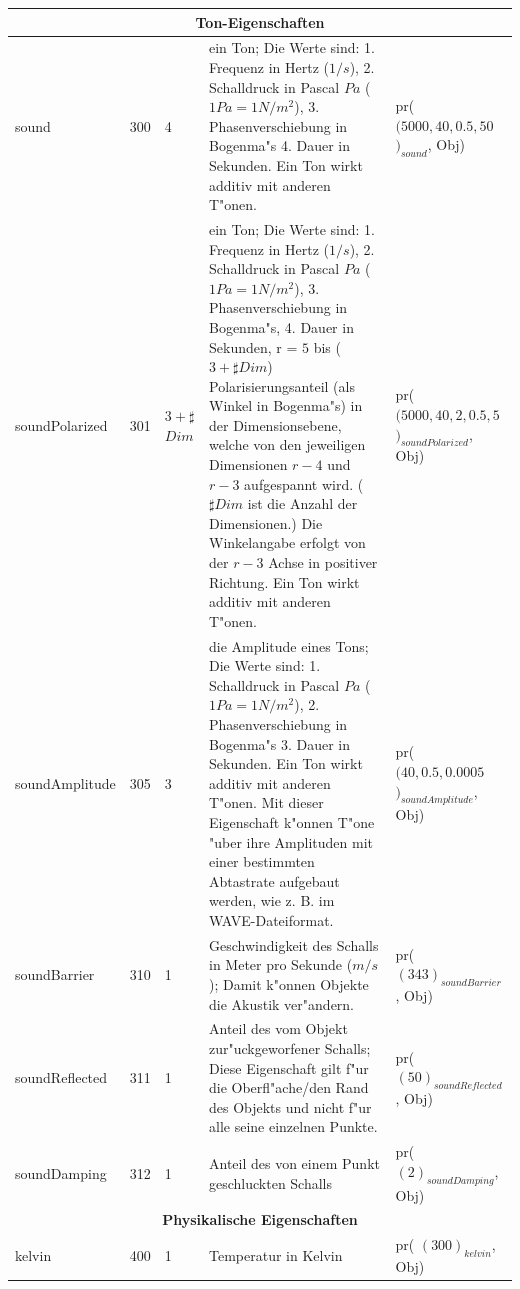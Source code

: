 \begin{small}
\begin{center}
\begin{longtable}{|p{22mm}|p{6mm}|p{5mm}|p{50mm}|p{30mm}|}
	\multicolumn{5}{|c|}{\textbf{Ton-Eigenschaften}}\\\hline
	sound & 300 & 4 & ein Ton; Die Werte sind: 1. Frequenz in Hertz ($1/s$), 2. Schalldruck in Pascal $Pa$ ($1 Pa= 1 N/m^2$), 3. Phasenverschiebung in Bogenma"s 4. Dauer in Sekunden. Ein Ton wirkt additiv mit anderen T"onen. & pr( $(5000, 40, 0.5, 50$ $)_{sound}$, Obj) \\\hline
	soundPolarized & 301 & $3 + \sharp$ $Dim$ & ein Ton; Die Werte sind: 1. Frequenz in Hertz ($1/s$), 2. Schalldruck in Pascal $Pa$ ($1 Pa= 1 N/m^2$), 3. Phasenverschiebung in Bogenma"s, 4. Dauer in Sekunden, r = $5$ bis ($3 + \sharp Dim$) Polarisierungsanteil (als Winkel in Bogenma"s) in der Dimensionsebene, welche von den jeweiligen Dimensionen $r-4$ und $r-3$ aufgespannt wird. ($\sharp Dim$ ist die Anzahl der Dimensionen.) Die Winkelangabe erfolgt von der $r-3$ Achse in positiver Richtung. Ein Ton wirkt additiv mit anderen T"onen. & pr( $(5000, 40, 2, 0.5, 5$ $)_{soundPolarized}$, Obj) \\\hline

	soundAmplitude & 305 & 3 & die Amplitude eines Tons; Die Werte sind: 1. Schalldruck in Pascal $Pa$ ($1 Pa= 1 N/m^2$), 2. Phasenverschiebung in Bogenma"s 3. Dauer in Sekunden. Ein Ton wirkt additiv mit anderen T"onen. Mit dieser Eigenschaft k"onnen T"one "uber ihre Amplituden mit einer bestimmten Abtastrate aufgebaut werden, wie z. B. im WAVE-Dateiformat. & pr( $( 40, 0.5, 0.0005$ $)_{soundAmplitude}$, Obj) \\\hline

	soundBarrier & 310 & 1 & Geschwindigkeit des Schalls in Meter pro Sekunde ($m/s$); Damit k"onnen Objekte die Akustik ver"andern. & pr( $(343)_{soundBarrier}$, Obj) \\\hline
	soundReflected & 311 & 1 & Anteil des vom Objekt zur"uckgeworfener Schalls; Diese Eigenschaft gilt f"ur die Oberfl"ache/den Rand des Objekts und nicht f"ur alle seine einzelnen Punkte. & pr( $(50)_{soundReflected}$, Obj) \\\hline
	soundDamping & 312 & 1 & Anteil des von einem Punkt geschluckten Schalls & pr( $(2)_{soundDamping}$, Obj) \\\hline

	\multicolumn{5}{|c|}{\textbf{Physikalische Eigenschaften}}\\\hline
	kelvin & 400 & 1 & Temperatur in Kelvin & pr( $(300)_{kelvin}$, Obj) \\\hline


\end{longtable}
\end{center}
\end{small}
